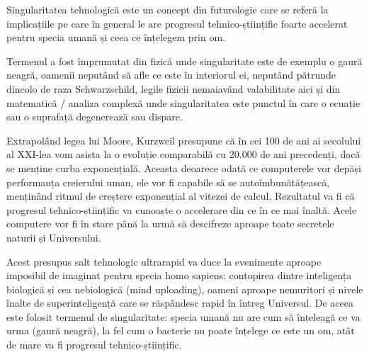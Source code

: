 Singularitatea tehnologică este un concept din futurologie care se referă la implicațiile pe care în general le are progresul tehnico-științific foarte accelerat pentru specia umană și ceea ce înțelegem prin om.

Termenul a fost împrumutat din fizică unde singularitate este de exemplu o gaură neagră, oamenii neputând să afle ce este în interiorul ei, neputând pătrunde dincolo de raza Schwarzschild, legile fizicii nemaiavând valabilitate aici și din  matematică / analiza complexă unde singularitatea este punctul în care o ecuație sau o suprafață degenerează sau dispare.

Extrapolând legea lui Moore, Kurzweil presupune că în cei 100 de ani ai secolului al XXI-lea vom asista la o evoluție comparabilă cu 20.000 de ani precedenți, dacă se menține curba exponențială. Aceasta deoarece odată ce computerele vor depăși performanța creierului uman, ele vor fi capabile să se autoîmbunătățească, menținând ritmul de creștere exponențial al vitezei de calcul. Rezultatul va fi că progresul tehnico-științific va cunoaște o accelerare din ce în ce mai înaltă. Acele computere vor fi în stare până la urmă să descifreze aproape toate secretele naturii și Universului.

Acest presupus salt tehnologic ultrarapid va duce la evenimente aproape imposibil de imaginat pentru specia homo sapiens: contopirea dintre inteligența biologică și cea nebiologică (mind uploading), oameni aproape nemuritori și nivele înalte de superinteligență care se răspândesc rapid în întreg Universul. De aceea este folosit termenul de singularitate: specia umană nu are cum să înțeleagă ce va urma (gaură neagră), la fel cum o bacterie nu poate înțelege ce este un om, atât de mare va fi progresul tehnico-științific.